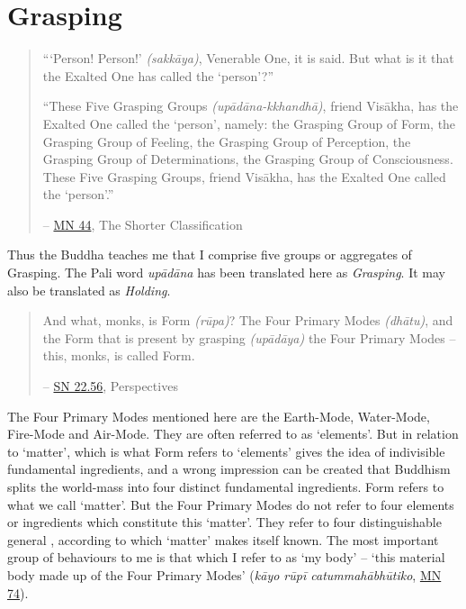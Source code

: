 \chapter{Grasping}

\begin{quote}
``\thinspace `Person! Person!' \emph{(sakkāya)}, Venerable One, it is said. But what is it that the Exalted One has called the `person'?''

``These Five Grasping Groups \emph{(upādāna-kkhandhā)}, friend Visākha, has the Exalted One called the `person', namely: the Grasping Group of Form, the Grasping Group of Feeling, the Grasping Group of Perception, the Grasping Group of Determinations, the Grasping Group of Consciousness. These Five Grasping Groups, friend Visākha, has the Exalted One called the `person'.''

 -- \href{https://suttacentral.net/mn44/en/sujato}{MN 44}, The Shorter Classification
\end{quote}

Thus the Buddha teaches me that I comprise five groups or aggregates of Grasping. The Pali word \emph{upādāna} has been translated here as \emph{Grasping}. It may also be translated as \emph{Holding}.

\begin{quote}
And what, monks, is Form \emph{(rūpa)}? The Four Primary Modes \emph{(dhātu)}, and the Form that is present by grasping \emph{(upādāya)} the Four Primary Modes -- this, monks, is called Form.

 -- \href{https://suttacentral.net/sn22.56/en/bodhi}{SN 22.56}, Perspectives
\end{quote}

The Four Primary Modes mentioned here are the Earth-Mode, Water-Mode, Fire-Mode and Air-Mode. They are often referred to as `elements'. But in relation to `matter', which is what Form refers to `elements' gives the idea of indivisible fundamental ingredients, and a wrong impression can be created that Buddhism splits the world-mass into four distinct fundamental ingredients. Form refers to what we call `matter'. But the Four Primary Modes do not refer to four elements or ingredients which constitute this `matter'. They refer to four distinguishable general , according to which `matter' makes itself known. The most important group of behaviours to me is that which I refer to as `my body' -- `this material body made up of the Four Primary Modes' (\emph{kāyo rūpī catummahābhūtiko}, \href{https://suttacentral.net/mn74/en/sujato}{MN 74}).


